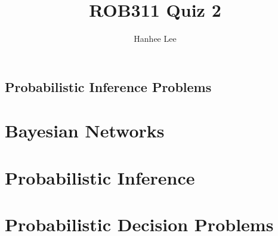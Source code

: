 \documentclass{article}
\title{ROB311 Quiz 2}
\author{Hanhee Lee}
\begin{document}
\maketitle

\tableofcontents
\newpage

\begin{center}
    \section*{Probabilistic Inference Problems}
\end{center}

\section{Bayesian Networks}

\newpage

\section{Probabilistic Inference}

\newpage

\section{Probabilistic Decision Problems}

\newpage
\end{document}
